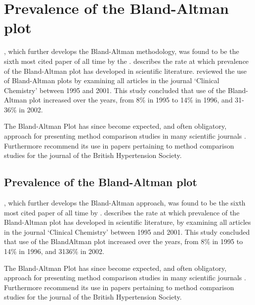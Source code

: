 \documentclass[MAIN.tex]{subfiles}
\begin{document}
\section{Prevalence of the Bland-Altman plot}

\citet*{BA86}, which further develops the Bland-Altman methodology,
was found to be the sixth most cited paper of all time by the
\citet{BAcite}. \cite{Dewitte} describes the rate at which
prevalence of the Bland-Altman plot has developed in scientific
literature. \citet{Dewitte} reviewed the use of Bland-Altman plots
by examining all articles in the journal `Clinical Chemistry'
between 1995 and 2001. This study concluded that use of the
Bland-Altman plot increased over the years, from 8\% in 1995 to
14\% in 1996, and 31-36\% in 2002.

The Bland-Altman Plot has since become expected, and
often obligatory, approach for presenting method comparison
studies in many scientific journals \citep{hollis}. Furthermore
\citet{BritHypSoc} recommend its use in papers pertaining to
method comparison studies for the journal of the British
Hypertension Society.

\subsection{Prevalence of the Bland-Altman plot}
\citet*{BA86}, which further develops the Bland-Altman approach, was found to be the sixth most cited paper of all time by \citet{BAcite}. \cite{Dewitte} describes the rate at which	prevalence of the Bland-Altman plot has developed in scientific literature, by examining all articles in the journal `Clinical Chemistry' between 1995 and 2001. This study concluded that use of the BlandAltman plot increased over the years, from 8\% in 1995 to 14\% in 1996, and 3136\% in 2002.

The Bland-Altman Plot has since become expected, and often obligatory, approach for presenting method comparison studies in many scientific journals \citep{hollis}. Furthermore	\citet{BritHypSoc} recommend its use in papers pertaining to method comparison studies for the journal of the British Hypertension Society.
\end{document}
